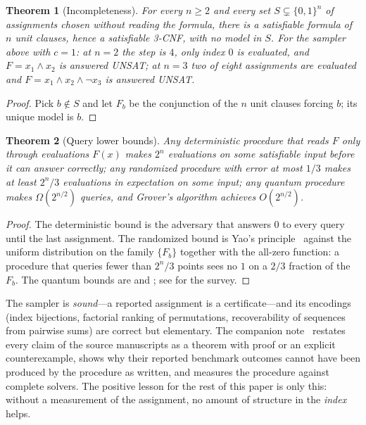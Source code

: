 \documentclass[11pt]{article}
\newtheorem{theorem}{Theorem}[section]
\theoremstyle{definition}
\theoremstyle{remark}
\newcommand{\F}{F}
\begin{document}
\begin{theorem}[Incompleteness]\label{thm:incomplete}
For every $n \ge 2$ and every set $S \subsetneq \{0,1\}^n$ of assignments chosen without reading the formula, there is a satisfiable formula of $n$ unit clauses, hence a satisfiable 3-CNF, with no model in $S$. For the sampler above with $c = 1$: at $n = 2$ the step is $4$, only index $0$ is evaluated, and $F = x_1 \wedge x_2$ is answered UNSAT; at $n = 3$ two of eight assignments are evaluated and $F = x_1 \wedge x_2 \wedge \neg x_3$ is answered UNSAT.
\end{theorem}
\begin{proof}
Pick $b \notin S$ and let $F_b$ be the conjunction of the $n$ unit clauses forcing $b$; its unique model is $b$.
\end{proof}

\begin{theorem}[Query lower bounds]\label{thm:queries}
Any deterministic procedure that reads $\F$ only through evaluations $\F(x)$ makes $2^n$ evaluations on some satisfiable input before it can answer correctly; any randomized procedure with error at most $1/3$ makes at least $2^n/3$ evaluations in expectation on some input; any quantum procedure makes $\Omega(2^{n/2})$ queries, and Grover's algorithm achieves $O(2^{n/2})$.
\end{theorem}
\begin{proof}
The deterministic bound is the adversary that answers $0$ to every query until the last assignment. The randomized bound is Yao's principle~\citep{Yao77} against the uniform distribution on the family $\{F_b\}$ together with the all-zero function: a procedure that queries fewer than $2^n/3$ points sees no $1$ on a $2/3$ fraction of the $F_b$. The quantum bounds are \citet{BBBV97} and \citet{Gro96}; see \citet{BdW02} for the survey.
\end{proof}

The sampler is \emph{sound}---a reported assignment is a certificate---and its encodings (index bijections, factorial ranking of permutations, recoverability of sequences from pairwise sums) are correct but elementary. The companion note~\citep{McE26note} restates every claim of the source manuscripts as a theorem with proof or an explicit counterexample, shows why their reported benchmark outcomes cannot have been produced by the procedure as written, and measures the procedure against complete solvers. The positive lesson for the rest of this paper is only this: without a measurement of the assignment, no amount of structure in the \emph{index} helps.
\end{document}
